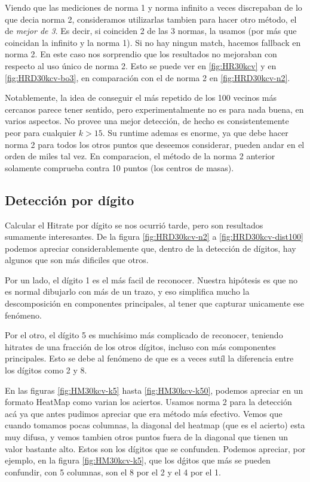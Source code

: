 Viendo que las mediciones de norma 1 y norma infinito a veces discrepaban de lo que
decia norma 2, consideramos utilizarlas tambien para hacer otro m\'etodo, el de \textit{mejor
de 3}. Es decir, si coinciden 2 de las 3 normas, la usamos (por m\'as que coincidan la
infinito y la norma 1). Si no hay ningun match, hacemos fallback en norma 2. En este caso
nos sorprendio que los resultados no mejoraban con respecto al uso \'unico de norma 2.
Esto se puede ver en \ref{fig:HR30kcv} y en \ref{fig:HRD30kcv-bo3}, en comparaci\'on con
el de norma 2 en \ref{fig:HRD30kcv-n2}.

Notablemente, la idea de conseguir el m\'as repetido de los 100 vecinos m\'as cercanos
parece tener sentido, pero experimentalmente no es para nada buena, en varios aspectos.
No provee una mejor detecci\'on, de hecho es consistentemente peor para cualquier $k>15$.
Su runtime ademas es enorme, ya que debe hacer norma 2 para todos los otros puntos que
deseemos considerar, pueden andar en el orden de miles tal vez. En comparacion, el m\'etodo
de la norma 2 anterior solamente comprueba contra 10 puntos (los centros de masas).


\subsection{Detecci\'on por d\'igito}
Calcular el Hitrate por d\'igito se nos ocurri\'o tarde, pero son resultados
sumamente interesantes. De la figura \ref{fig:HRD30kcv-n2} a \ref{fig:HRD30kcv-dist100}
podemos apreciar considerablemente que, dentro de
la detecci\'on de d\'igitos, hay algunos que son m\'as dificiles que otros.

Por un lado, el d\'igito 1 es el m\'as facil de reconocer. Nuestra hip\'otesis
es que no es normal dibujarlo con m\'as de un trazo, y eso simplifica mucho la
descomposici\'on en componentes principales, al tener que capturar unicamente ese
fen\'omeno.

Por el otro, el d\'igito 5 es much\'isimo m\'as complicado de reconocer, teniendo
hitrates de una fracci\'on de los otros d\'igitos, incluso con m\'as componentes
principales. Esto se debe al fen\'omeno de que es a veces sut\'il la diferencia
entre los d\'igitos como 2 y 8.

En las figuras \ref{fig:HM30kcv-k5} hasta \ref{fig:HM30kcv-k50}, podemos apreciar
en un formato HeatMap como varian los aciertos. Usamos norma 2 para la detecci\'on ac\'a
ya que antes pudimos apreciar que era m\'etodo m\'as efectivo. Vemos que cuando tomamos pocas
columnas, la diagonal del heatmap (que es el acierto) esta muy difusa, y vemos tambien
otros puntos fuera de la diagonal que tienen un valor bastante alto. Estos son los d\'igitos
que se confunden. Podemos apreciar, por ejemplo, en la figura \ref{fig:HM30kcv-k5}, que
los d\'gitos que m\'as se pueden confundir, con 5 columnas, son el 8 por el 2 y el 4 por el 1.

